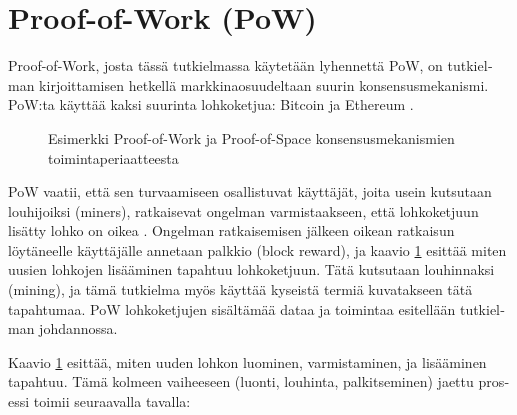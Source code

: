 \section{Proof-of-Work (PoW)\label{pow}}
\begin{otherlanguage}{english}
Proof-of-Work, josta tässä tutkielmassa käytetään lyhennettä PoW, on tutkielman kirjoittamisen hetkellä markkinaosuudeltaan suurin konsensusmekanismi. PoW:ta käyttää kaksi suurinta lohkoketjua: Bitcoin ja Ethereum \cite{Coingecko}.

\begin{figure}[!htbp]
\centering
{}
\caption{Esimerkki Proof-of-Work ja Proof-of-Space konsensusmekanismien toimintaperiaatteesta}
\label{fig_pow}
\end{figure}

\vspace{1mm}

PoW vaatii, että sen turvaamiseen osallistuvat käyttäjät, joita usein kutsutaan louhijoiksi (miners), ratkaisevat ongelman varmistaakseen, että lohkoketjuun lisätty lohko on oikea \cite{blockchain1}. Ongelman ratkaisemisen jälkeen oikean ratkaisun löytäneelle käyttäjälle annetaan palkkio (block reward), ja kaavio \ref{fig_pow} esittää miten uusien lohkojen lisääminen tapahtuu lohkoketjuun. Tätä kutsutaan louhinnaksi (mining), ja tämä tutkielma myös käyttää kyseistä termiä kuvatakseen tätä tapahtumaa. PoW lohkoketjujen sisältämää dataa ja toimintaa esitellään tutkielman johdannossa.

Kaavio \ref{fig_pow} esittää, miten uuden lohkon luominen, varmistaminen, ja lisääminen tapahtuu. Tämä kolmeen vaiheeseen (luonti, louhinta, palkitseminen) jaettu prosessi toimii seuraavalla tavalla:


\end{otherlanguage}
